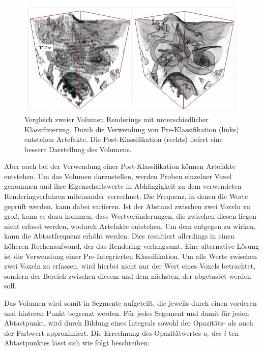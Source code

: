 \begin{figure}[!htb]
	\centering
	\includegraphics[width=0.7\linewidth]{images/prepostclassification.png}
	\caption{Vergleich zweier Volumen Renderings mit unterschiedlicher Klassifizierung. Durch die Verwendung von Pre-Klassifikation (links) entstehen Artefakte. Die Post-Klassifikation (rechts) liefert eine bessere Darstellung des Volumens.}
	\label{img:prepost}
\end{figure}
\FloatBarrier

Aber auch bei der Verwendung einer Post-Klassifikation können Artefakte entstehen.
Um das Volumen darzustellen, werden Proben einzelner Voxel genommen und ihre Eigenschaftswerte in Abhängigkeit zu dem verwendeten Renderingverfahren miteinander verrechnet. 
Die Frequenz, in denen die Werte geprüft werden, kann dabei variieren. Ist der Abstand zwischen zwei Voxeln zu groß, kann es dazu kommen, dass Wertveränderungen, die zwischen diesen liegen nicht erfasst werden, wodurch Artefakte entstehen. 
Um dem entgegen zu wirken, kann die Abtastfrequenz erhöht werden. Dies resultiert allerdings in einen höheren Rechenaufwand, der das Rendering verlangsamt.
Eine alternative Lösung ist die Verwendung einer Pre-Integrierten Klassifikation.
Um alle Werte zwischen zwei Voxeln zu erfassen, wird hierbei nicht nur der Wert eines Voxels betrachtet, sondern der Bereich zwischen diesem und dem nächsten, der abgetastet werden soll. 

Das Volumen wird somit in Segmente aufgeteilt, die jeweils durch einen vorderen und hinteren Punkt begrenzt werden. Für jedes Segement und damit für jeden Abtastpunkt, wird durch Bildung eines Integrals sowohl der Opazitäts- als auch der Farbwert approximiert. 
Die Errechnung des Opazitätwertes $a_i$ des  $i$-ten Abtastpunktes lässt sich wie folgt beschreiben:

